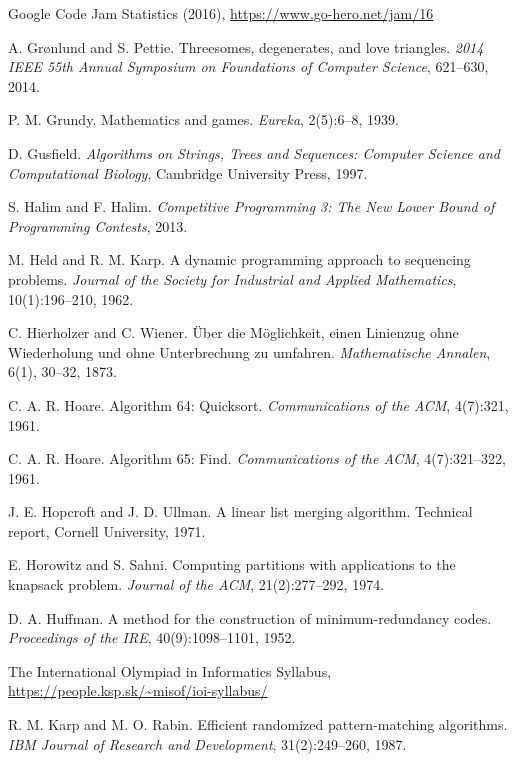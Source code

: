 \begin{thebibliography}{9}
  Google Code Jam Statistics (2016),
  \url{https://www.go-hero.net/jam/16}

  A. Grønlund and S. Pettie.
  Threesomes, degenerates, and love triangles.
  \emph{2014 IEEE 55th Annual Symposium on Foundations of Computer Science},
  621--630, 2014.

  P. M. Grundy.
  Mathematics and games.
  \emph{Eureka}, 2(5):6--8, 1939.

  D. Gusfield.
  \emph{Algorithms on Strings, Trees and Sequences:
  Computer Science and Computational Biology},
  Cambridge University Press, 1997.


  S. Halim and F. Halim.
  \emph{Competitive Programming 3: The New Lower Bound of Programming Contests}, 2013.

  M. Held and R. M. Karp.
  A dynamic programming approach to sequencing problems.
  \emph{Journal of the Society for Industrial and Applied Mathematics}, 10(1):196--210, 1962.

  C. Hierholzer and C. Wiener.
  Über die Möglichkeit, einen Linienzug ohne Wiederholung und ohne Unterbrechung zu umfahren.
  \emph{Mathematische Annalen}, 6(1), 30--32, 1873.

  C. A. R. Hoare.
  Algorithm 64: Quicksort.
  \emph{Communications of the ACM}, 4(7):321, 1961.

  C. A. R. Hoare.
  Algorithm 65: Find.
  \emph{Communications of the ACM}, 4(7):321--322, 1961.

  J. E. Hopcroft and J. D. Ullman.
  A linear list merging algorithm.
  Technical report, Cornell University, 1971.

  E. Horowitz and S. Sahni.
  Computing partitions with applications to the knapsack problem.
  \emph{Journal of the ACM}, 21(2):277--292, 1974.

  D. A. Huffman.
  A method for the construction of minimum-redundancy codes.
  \emph{Proceedings of the IRE}, 40(9):1098--1101, 1952.

  The International Olympiad in Informatics Syllabus,
  \url{https://people.ksp.sk/~misof/ioi-syllabus/}

  R. M. Karp and M. O. Rabin.
  Efficient randomized pattern-matching algorithms.
  \emph{IBM Journal of Research and Development}, 31(2):249--260, 1987.


\end{thebibliography}
